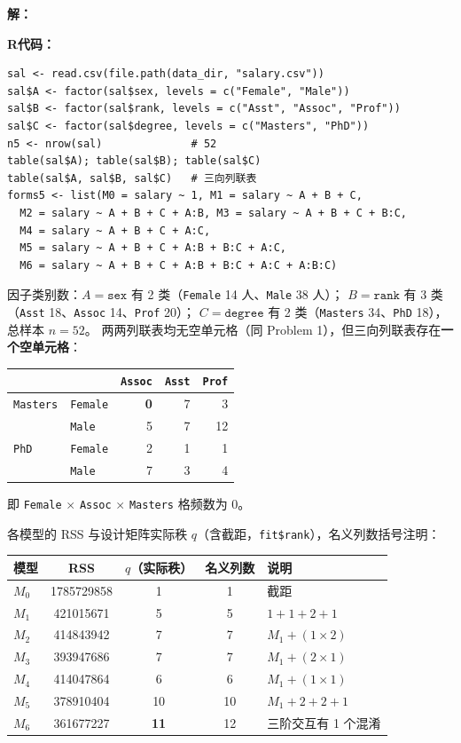 \documentclass[12pt,a4paper]{article}
\begin{document}
\begin{answerbox}
\textbf{解：}

\textbf{R代码：}
\begin{lstlisting}[style=rcode]
sal <- read.csv(file.path(data_dir, "salary.csv"))
sal$A <- factor(sal$sex, levels = c("Female", "Male"))
sal$B <- factor(sal$rank, levels = c("Asst", "Assoc", "Prof"))
sal$C <- factor(sal$degree, levels = c("Masters", "PhD"))
n5 <- nrow(sal)              # 52
table(sal$A); table(sal$B); table(sal$C)
table(sal$A, sal$B, sal$C)   # 三向列联表
forms5 <- list(M0 = salary ~ 1, M1 = salary ~ A + B + C,
  M2 = salary ~ A + B + C + A:B, M3 = salary ~ A + B + C + B:C,
  M4 = salary ~ A + B + C + A:C,
  M5 = salary ~ A + B + C + A:B + B:C + A:C,
  M6 = salary ~ A + B + C + A:B + B:C + A:C + A:B:C)
\end{lstlisting}

因子类别数：$A=\texttt{sex}$ 有 2 类（\texttt{Female} 14 人、\texttt{Male} 38 人）；
$B=\texttt{rank}$ 有 3 类（\texttt{Asst} 18、\texttt{Assoc} 14、\texttt{Prof} 20）；
$C=\texttt{degree}$ 有 2 类（\texttt{Masters} 34、\texttt{PhD} 18），总样本 $n=52$。
两两列联表均无空单元格（同 Problem 1），但三向列联表存在\textbf{一个空单元格}：

\begin{center}
\small
\begin{tabular}{llrrr}
\toprule
 & & \texttt{Assoc} & \texttt{Asst} & \texttt{Prof} \\
\midrule
\texttt{Masters} & \texttt{Female} & \textbf{0} & 7 & 3 \\
 & \texttt{Male} & 5 & 7 & 12 \\
\texttt{PhD} & \texttt{Female} & 2 & 1 & 1 \\
 & \texttt{Male} & 7 & 3 & 4 \\
\bottomrule
\end{tabular}
\end{center}
即 \texttt{Female} $\times$ \texttt{Assoc} $\times$ \texttt{Masters} 格频数为 0。

各模型的 RSS 与设计矩阵实际秩 $q$（含截距，\texttt{fit\$rank}），名义列数括号注明：
\begin{center}
\small
\begin{tabular}{lcccl}
\toprule
模型 & RSS & $q$（实际秩） & 名义列数 & 说明 \\
\midrule
$M_0$ & 1785729858 & 1 & 1 & 截距 \\
$M_1$ & 421015671 & 5 & 5 & $1+1+2+1$ \\
$M_2$ & 414843942 & 7 & 7 & $M_1+(1\times 2)$ \\
$M_3$ & 393947686 & 7 & 7 & $M_1+(2\times 1)$ \\
$M_4$ & 414047864 & 6 & 6 & $M_1+(1\times 1)$ \\
$M_5$ & 378910404 & 10 & 10 & $M_1+2+2+1$ \\
$M_6$ & 361677227 & \textbf{11} & 12 & 三阶交互有 1 个混淆 \\
\bottomrule
\end{tabular}
\end{center}


\end{answerbox}
\end{document}
